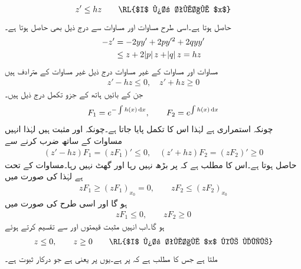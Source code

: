 \begin{align}\label{مساوات_ضمیمہ_شرط_الف}
z' \le hz\quad \quad \text{\RL{$I$ پر تمام $x$}}
\end{align}
حاصل ہوتا  ہے۔اسی طرح مساوات  اور مساوات  سے درج ذیل بھی حاصل ہوتا ہے۔
\begin{gather}
\begin{aligned}\label{مساوات_ضمیمہ_شرط_ب}
-z'&=-2yy'+2py'^2+2qyy'\\
& \le z+2\abs{p}z+\abs{q}z=hz
\end{aligned}
\end{gather}
مساوات  اور مساوات  کے غیر مساوات  درج ذیل غیر مساوات کے مترادف ہیں
\begin{align}\label{مساوات_ضمیمہ_شرط_پ}
z'-hz \le 0, \quad z'+hz\ge 0
\end{align}
جن کے بائیں ہاتھ کے جزو تکمل درج ذیل ہیں۔
\begin{align*}
F_1=e^{-\int h(x)\dif x}, \quad \quad F_2=e^{\int h(x)\dif x}
\end{align*}
چونکہ  استمراری ہے لہٰذا اس کا تکمل پایا جاتا ہے۔چونکہ  اور  مثبت ہیں لہٰذا انہیں مساوات  کے ساتھ ضرب کرنے سے
\begin{align*}
(z'-hz)F_1=(zF_1)' \le 0, \quad  (z'+hz)F_2=(zF_2)' \ge 0
\end{align*}
حاصل ہوتا ہے۔اس کا مطلب ہے کہ  پر  بڑھ نہیں رہا اور  گھٹ نہیں رہا۔مساوات  کے تحت  ہے  لہٰذا  کی صورت میں
\begin{align}
zF_1 \ge (zF_1)_{x_0}=0, \quad \quad zF_2\le (zF_2)_{x_0}
\end{align}
ہو گا اور اسی طرح  کی صورت میں
\begin{align}
zF_1\le 0, \quad \quad zF_2 \ge 0
\end{align}
ہو گا۔اب انہیں مثبت قیمتوں  اور  سے تقسیم کرتے ہوئے
\begin{align}
z\le 0, \quad \quad z \ge 0 \quad \quad \text{\RL{$I$ پر تمام $x$ کے لیے}}
\end{align}
ملتا ہے جس کا مطلب ہے کہ  پر  ہے۔یوں  پر   یعنی  ہے جو درکار ثبوت ہے۔
